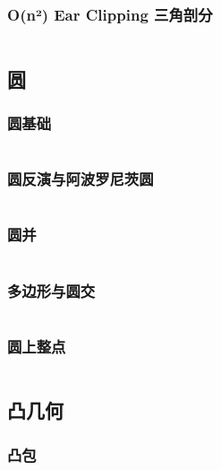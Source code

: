 		\subsubsection{O(n²) Ear Clipping 三角剖分}
		\inputminted{cpp}{sections/ComputationalGeometry/assets/Geometry/Triangulation.cpp}

\subsection{圆}
	\subsubsection{圆基础}
		\inputminted{cpp}{sections/ComputationalGeometry/assets/Geometry/8.4-circle.cpp}
	\subsubsection{圆反演与阿波罗尼茨圆}
		\begin{small}
			
		\end{small}
		\inputminted{cpp}{sections/ComputationalGeometry/assets/yzh/circle_inversion.cpp}
	\subsubsection{圆并}
		\inputminted{cpp}{sections/ComputationalGeometry/assets/Geometry/圆并.cpp}
	\subsubsection{多边形与圆交}
		\inputminted{cpp}{sections/ComputationalGeometry/assets/Geometry/多边形和圆的交.cpp}
	\subsubsection{圆上整点}
		\inputminted{cpp}{sections/ComputationalGeometry/assets/Geometry/圆上整点.cpp}

\subsection{凸几何}
	\subsubsection{凸包}
		\inputminted{cpp}{sections/ComputationalGeometry/assets/Geometry/凸包.cpp}
